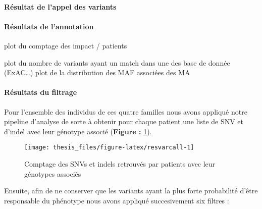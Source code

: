 \documentclass[12pt,twoside]{reedthesis}
\theoremstyle{definition}
\theoremstyle{definition}
\theoremstyle{remark}
\begin{document}
  \paragraph{Résultat de l'appel des
  variants}\label{resultat-de-lappel-des-variants}
  
  \paragraph{Résultats de l'annotation}\label{resultats-de-lannotation}
  
  plot du comptage des impact / patients
  
  plot du nombre de variants ayant un match dans une des base de donnée
  (ExAC\ldots{}) plot de la distribution des MAF associées des MA
  
  \paragraph{Résultats du filtrage}\label{resultats-du-filtrage}
  
  Pour l'ensemble des individus de ces quatre familles nous avons appliqué
  notre pipeline d'analyse de sorte à obtenir pour chaque patient une
  liste de SNV et d'indel avec leur génotype associé (\textbf{Figure :
  }\ref{fig:resvarcall}).
  
  \begin{figure}
  
  {\centering \texttt{[image: thesis\_files/figure-latex/resvarcall-1]} 
  
  }
  
  \caption[Comptage des SNVs et indels retrouvés par patients avec leur génotypes associés]{Comptage des SNVs et indels retrouvés par patients avec leur génotypes associés}\label{fig:resvarcall}
  \end{figure}
  
  Ensuite, afin de ne conserver que les variants ayant la plus forte
  probabilité d'être responsable du phénotype nous avons appliqué
  succesivement six filtres :
  
\end{document}
